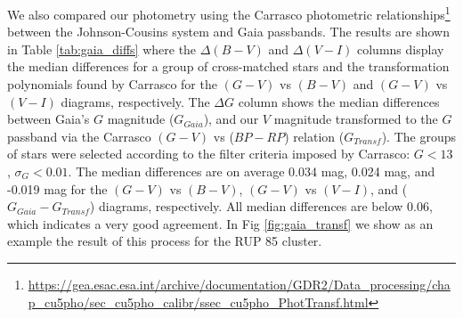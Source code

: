 \documentclass[draft]{aa}
\begin{document}
We also compared our photometry using the Carrasco photometric
relationships\footnote{\url{https://gea.esac.esa.int/archive/documentation/GDR2/Data_processing/chap_cu5pho/sec_cu5pho_calibr/ssec_cu5pho_PhotTransf.html}}
between the Johnson-Cousins system and Gaia passbands. The results are shown in
Table \ref{tab:gaia_diffs} where the $\Delta (B-V)$ and $\Delta (V-I)$ columns
display the median differences for a group of cross-matched stars and the
transformation polynomials found by Carrasco for the $(G-V)$ vs $(B-V)$ and
$(G-V)$ vs $(V-I)$ diagrams, respectively. The $\Delta G$ column shows the
median differences between Gaia's $G$ magnitude ($G_{Gaia}$), and our $V$
magnitude transformed to the $G$ passband via the Carrasco $(G-V)$ vs ($BP-RP$)
relation ($G_{Transf}$).
The groups of stars were selected according to the filter
criteria imposed by Carrasco: $G<13$, $\sigma_{G}<0.01$. The median differences
are on average 0.034 mag, 0.024 mag, and -0.019 mag for the $(G-V)$ vs $(B-V)$,
$(G-V)$ vs $(V-I)$, and ($G_{Gaia}-G_{Transf}$) diagrams, respectively.
All median differences are below 0.06, which indicates a very good agreement.
In Fig \ref{fig:gaia_transf} we show as an example the result of this process
for the RUP 85 cluster.\\
\end{document}
